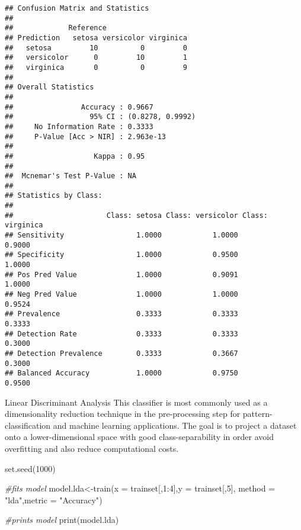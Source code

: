 \documentclass[
]{article}
\newenvironment{Shaded}{\begin{snugshade}}{\end{snugshade}}
\newcommand{\AttributeTok}[1]{\textcolor[rgb]{0.77,0.63,0.00}{#1}}
\newcommand{\CommentTok}[1]{\textcolor[rgb]{0.56,0.35,0.01}{\textit{#1}}}
\newcommand{\DecValTok}[1]{\textcolor[rgb]{0.00,0.00,0.81}{#1}}
\newcommand{\FunctionTok}[1]{\textcolor[rgb]{0.00,0.00,0.00}{#1}}
\newcommand{\NormalTok}[1]{#1}
\newcommand{\OtherTok}[1]{\textcolor[rgb]{0.56,0.35,0.01}{#1}}
\newcommand{\SpecialCharTok}[1]{\textcolor[rgb]{0.00,0.00,0.00}{#1}}
\newcommand{\StringTok}[1]{\textcolor[rgb]{0.31,0.60,0.02}{#1}}
\begin{document}
\begin{verbatim}
## Confusion Matrix and Statistics
## 
##             Reference
## Prediction   setosa versicolor virginica
##   setosa         10          0         0
##   versicolor      0         10         1
##   virginica       0          0         9
## 
## Overall Statistics
##                                           
##                Accuracy : 0.9667          
##                  95% CI : (0.8278, 0.9992)
##     No Information Rate : 0.3333          
##     P-Value [Acc > NIR] : 2.963e-13       
##                                           
##                   Kappa : 0.95            
##                                           
##  Mcnemar's Test P-Value : NA              
## 
## Statistics by Class:
## 
##                      Class: setosa Class: versicolor Class: virginica
## Sensitivity                 1.0000            1.0000           0.9000
## Specificity                 1.0000            0.9500           1.0000
## Pos Pred Value              1.0000            0.9091           1.0000
## Neg Pred Value              1.0000            1.0000           0.9524
## Prevalence                  0.3333            0.3333           0.3333
## Detection Rate              0.3333            0.3333           0.3000
## Detection Prevalence        0.3333            0.3667           0.3000
## Balanced Accuracy           1.0000            0.9750           0.9500
\end{verbatim}

Linear Discriminant Analysis This classifier is most commonly used as a
dimensionality reduction technique in the pre-processing step for
pattern-classification and machine learning applications. The goal is to
project a dataset onto a lower-dimensional space with good
class-separability in order avoid overfitting and also reduce
computational costs.

\begin{Shaded}
\begin{Highlighting}[]
\FunctionTok{set.seed}\NormalTok{(}\DecValTok{1000}\NormalTok{)}

\CommentTok{\#fits model}
\NormalTok{model.lda}\OtherTok{\textless{}{-}}\FunctionTok{train}\NormalTok{(}\AttributeTok{x =}\NormalTok{ trainset[,}\DecValTok{1}\SpecialCharTok{:}\DecValTok{4}\NormalTok{],}\AttributeTok{y =}\NormalTok{ trainset[,}\DecValTok{5}\NormalTok{], }\AttributeTok{method =} \StringTok{"lda"}\NormalTok{,}\AttributeTok{metric =} \StringTok{"Accuracy"}\NormalTok{)}

\CommentTok{\#prints model}
\FunctionTok{print}\NormalTok{(model.lda)}
\end{Highlighting}
\end{Shaded}
\end{document}
